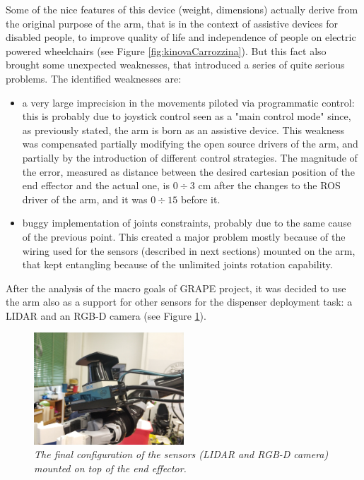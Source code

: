  Some of the nice features of this device (weight, dimensions) actually derive from the original purpose of the arm, that is in the context of assistive devices for disabled people, to improve quality of life and independence of people on  electric powered wheelchairs (see Figure \ref{fig:kinovaCarrozzina}). But this fact also brought some unexpected weaknesses, that introduced a series of quite serious problems. The identified weaknesses are:
 \begin{itemize}
 	\item a very large imprecision in the movements piloted via programmatic control: this is probably due to joystick control seen as a "main control mode" since, as previously stated, the arm is born as an assistive device. This weakness was compensated partially modifying the open source drivers of the arm, and partially by the introduction of different control strategies. The magnitude of the error, measured as distance between the desired cartesian position of the end effector and the actual one, is $0\div3$ cm after the changes to the \ac{ROS} driver of the arm, and it was $0\div15$ before it.
 	\item buggy implementation of joints constraints, probably due to the same cause of the previous point. This created a major problem mostly because of the wiring used for the sensors (described in next sections) mounted on the arm, that kept entangling because of the unlimited joints rotation capability.
 \end{itemize}
 
After the analysis of the macro goals of \ac{GRAPE} project, it was decided to use the arm also as a support for other sensors for the dispenser deployment task: a \ac{LIDAR} and an RGB-D camera (see Figure \ref{fig:sensoriEndEffector}).
  
 \begin{figure}
	\centering
	\includegraphics[width=0.5\textwidth]{Images/grape_sw_hw_architecture/sensoriEndEffector.jpg}
	\caption{\textit{The final configuration of the sensors (\ac{LIDAR} and RGB-D camera) mounted on top of the end effector.}}
	\label{fig:sensoriEndEffector}
\end{figure}


